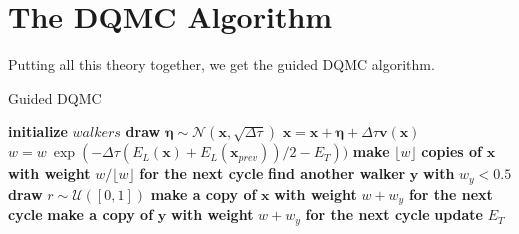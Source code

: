 \documentclass [12pt]{report}
\begin{document}
\section{The DQMC Algorithm}
Putting all this theory together, we get the guided DQMC algorithm.
\begin{algorithm}
\caption{Guided DQMC}\label{dqmc}
\begin{algorithmic}[1]
\State \textbf{initialize} $walkers$
		\State \textbf{draw} $\bm{\eta} \sim \mathcal{N}(\bm{x},\sqrt{\Delta \tau})$
		\State $\bm{x} = \bm{x} + \bm{\eta} + \Delta \tau \bm{v}(\bm{x})$ 
		\State $w = w \: \exp{(-\Delta \tau (E_L(\bm{x})+E_L(\bm{x}_{prev}))/2 - E_T))}$
		\State \textbf{make} $\lfloor w \rfloor$ \textbf{copies of} $\bm{x}$ \textbf{with weight} $w/\lfloor w \rfloor$ \textbf{for the next cycle}
		\EndIf
		\State \textbf{find another walker} $\bm{y}$ \textbf{with} $w_y < 0.5$
		\State \textbf{draw} $r \sim \mathcal{U}([0,1])$
		\State \textbf{make a copy of} $\bm{x}$ \textbf{with weight} $w+w_y$ \textbf{for the next cycle}
		\Else
		\State \textbf{make a copy of} $\bm{y}$ \textbf{with weight} $w+w_y$ \textbf{for the next cycle}
		\EndIf
		\EndIf 
	\EndFor
	\State \textbf{update} $E_T$ 
\EndFor 
\EndProcedure
\end{algorithmic}
\end{algorithm}
\newpage
\end{document}
